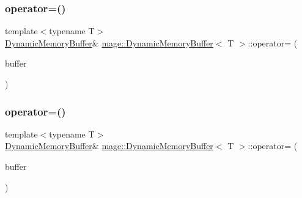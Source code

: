 \mbox{\label{classmage_1_1_dynamic_memory_buffer_afeaa37a7cdd398003c42ee12e8c4609d}} 
\subsubsection{\texorpdfstring{operator=()}{operator=()}\hspace{0.1cm}{\footnotesize\ttfamily [1/2]}}
{\footnotesize\ttfamily template$<$typename T$>$ \\
\mbox{\hyperlink{classmage_1_1_dynamic_memory_buffer}{Dynamic\+Memory\+Buffer}}\& \mbox{\hyperlink{classmage_1_1_dynamic_memory_buffer}{mage\+::\+Dynamic\+Memory\+Buffer}}$<$ T $>$\+::operator= (\begin{DoxyParamCaption}\item[{const \mbox{\hyperlink{classmage_1_1_dynamic_memory_buffer}{Dynamic\+Memory\+Buffer}}$<$ T $>$ \&}]{buffer }\end{DoxyParamCaption})\hspace{0.3cm}{\ttfamily [delete]}}

\mbox{\label{classmage_1_1_dynamic_memory_buffer_ab915eb0797354d2a1cbab95b1b7c4500}} 
\subsubsection{\texorpdfstring{operator=()}{operator=()}\hspace{0.1cm}{\footnotesize\ttfamily [2/2]}}
{\footnotesize\ttfamily template$<$typename T$>$ \\
\mbox{\hyperlink{classmage_1_1_dynamic_memory_buffer}{Dynamic\+Memory\+Buffer}}\& \mbox{\hyperlink{classmage_1_1_dynamic_memory_buffer}{mage\+::\+Dynamic\+Memory\+Buffer}}$<$ T $>$\+::operator= (\begin{DoxyParamCaption}\item[{\mbox{\hyperlink{classmage_1_1_dynamic_memory_buffer}{Dynamic\+Memory\+Buffer}}$<$ T $>$ \&\&}]{buffer }\end{DoxyParamCaption})\hspace{0.3cm}{\ttfamily [delete]}}

